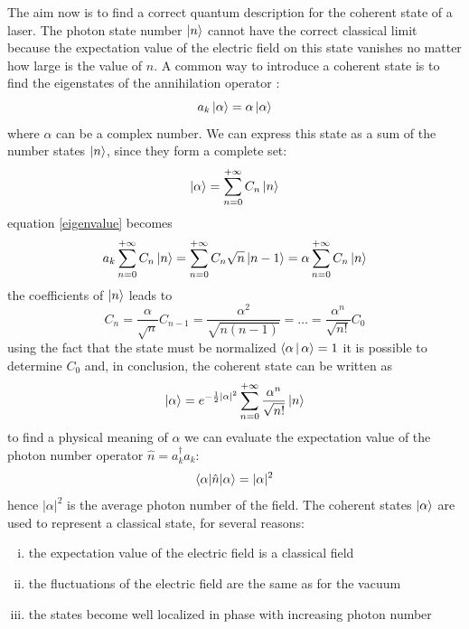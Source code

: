 \documentclass[12pt]{book}
\begin{document}
The aim now is to find a correct quantum description for the coherent state of a laser. The photon state number $\Ket{n}$ cannot have the correct classical limit because the expectation value of the electric field on this state vanishes no matter how large is the value of $n$. A common way to introduce a coherent state is to find the eigenstates of the annihilation operator \cite{book:qoptics}:
\begin{equation}\label{eigenvalue}
a_k\ket{\alpha} = \alpha \ket{\alpha}
\end{equation}
where $\alpha$ can be a complex number. We can express this state as a sum of the number states $\ket{n}$, since they form a complete set:
\begin{equation}\ket{\alpha} = \sum_{n=0}^{+\infty} C_n \ket{n}\end{equation}
equation \eqref{eigenvalue} becomes
\begin{equation}a_k\sum_{n=0}^{+\infty} C_n \ket{n} = \sum_{n=0}^{+\infty} C_n\sqrt{n}\ket{n-1} =\alpha\sum_{n=0}^{+\infty} C_n \ket{n}\end{equation}
the coefficients of $\ket{n}$ leads to
\begin{equation}C_n = \frac{\alpha}{\sqrt{n}}C_{n-1} = \frac{\alpha^2}{\sqrt{n(n-1)}} = \dots = \frac{\alpha^n}{\sqrt{n!}}C_0\end{equation}
using the fact that the state must be normalized $\Braket{\alpha|\alpha} = 1$ it is possible to determine $C_0$ and, in conclusion, the coherent state can be written as
\begin{equation}\label{coherentstate}
\ket{\alpha} = e^{-\frac{1}{2}|\alpha|^2}\sum_{n=0}^{+\infty} \frac{\alpha^n}{\sqrt{n!}}\ket{n}
\end{equation}
to find a physical meaning of $\alpha$ we can evaluate the expectation value of the photon number operator $\hat{n} = a_k^\dagger a_k$:
\begin{equation}\braket{\alpha|\hat{n}|\alpha} = |\alpha|^2 \end{equation}
hence $|\alpha|^2$ is the average photon number of the field. The coherent states $\ket{\alpha}$ are used to represent a classical state, for several reasons:
\begin{enumerate}[(i)]
\item the expectation value of the electric field is a classical field
\item the fluctuations of the electric field are the same as for the vacuum
\item the states become well localized in phase with increasing photon number
\end{enumerate}
\end{document}
